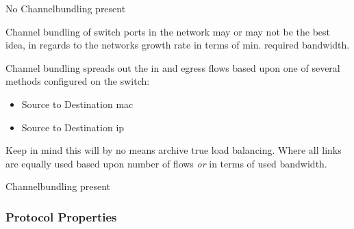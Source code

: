 %
{No Channelbundling present}

Channel bundling of switch ports in the network may or may not be the best idea, in regards to the networks growth rate in terms of min. required bandwidth.

Channel bundling spreads out the in and egress flows based upon one of several methods configured on the switch:
\begin{itemize}
    \item Source to Destination \gls{mac}
    \item Source to Destination \gls{ip}
\end{itemize}
Keep in mind this will by no means archive true load balancing. Where all links are equally used based upon number of flows \textit{or} in terms of used bandwidth.

\begin{table}[h]
    \centering
    \caption{Channel bundling mechanisms}
    \label{chbundmech1}
\end{table}

%
{Channelbundling present}

\subsubsection{Protocol Properties}

